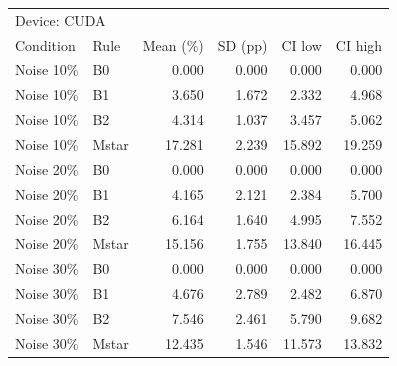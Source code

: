 \begin{tabular}{llrrrr}
\toprule
\multicolumn{6}{l}{Device: CUDA} \\
Condition & Rule & Mean (\%) & SD (pp) & CI low & CI high \\
\midrule
Noise 10\% & B0 & 0.000 & 0.000 & 0.000 & 0.000 \\
Noise 10\% & B1 & 3.650 & 1.672 & 2.332 & 4.968 \\
Noise 10\% & B2 & 4.314 & 1.037 & 3.457 & 5.062 \\
Noise 10\% & Mstar & 17.281 & 2.239 & 15.892 & 19.259 \\
Noise 20\% & B0 & 0.000 & 0.000 & 0.000 & 0.000 \\
Noise 20\% & B1 & 4.165 & 2.121 & 2.384 & 5.700 \\
Noise 20\% & B2 & 6.164 & 1.640 & 4.995 & 7.552 \\
Noise 20\% & Mstar & 15.156 & 1.755 & 13.840 & 16.445 \\
Noise 30\% & B0 & 0.000 & 0.000 & 0.000 & 0.000 \\
Noise 30\% & B1 & 4.676 & 2.789 & 2.482 & 6.870 \\
Noise 30\% & B2 & 7.546 & 2.461 & 5.790 & 9.682 \\
Noise 30\% & Mstar & 12.435 & 1.546 & 11.573 & 13.832 \\
\bottomrule
\end{tabular}
